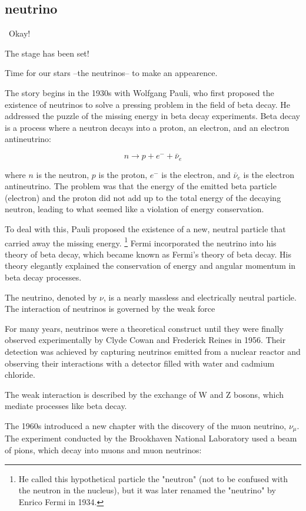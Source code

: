\subsection{neutrino}\
Okay!

The stage has been set!

Time for our stars --the neutrinos-- to make an appearence.

The story begins in the 1930s with Wolfgang Pauli, who first proposed the existence of neutrinos to solve a pressing problem in the field of beta decay.
He addressed the puzzle of the missing energy in beta decay experiments.
Beta decay is a process where a neutron decays into a proton, an electron, and an electron antineutrino:

\[
  n \rightarrow p + e^- + \bar{\nu}_e
\]

where \( n \) is the neutron, \( p \) is the proton, \( e^- \) is the electron, and \( \bar{\nu}_e \) is the electron antineutrino.
The problem was that the energy of the emitted beta particle (electron) and the proton did not add up to the total energy of the decaying neutron, leading to what seemed like a violation of energy conservation.

To deal with this, Pauli proposed the existence of a new, neutral particle that carried away the missing energy.
\footnote{He called this hypothetical particle the "neutron" (not to be confused with the neutron in the nucleus), but it was later renamed the "neutrino" by Enrico Fermi in 1934.}
Fermi incorporated the neutrino into his theory of beta decay, which became known as Fermi's theory of beta decay.
His theory elegantly explained the conservation of energy and angular momentum in beta decay processes.

The neutrino, denoted by \( \nu \), is a nearly massless and electrically neutral particle.
The interaction of neutrinos is governed by the weak force

For many years, neutrinos were a theoretical construct until they were finally observed experimentally by Clyde Cowan and Frederick Reines in 1956.
Their detection was achieved by capturing neutrinos emitted from a nuclear reactor and observing their interactions with a detector filled with water and cadmium chloride.

The weak interaction is described by the exchange of W and Z bosons, which mediate processes like beta decay.

The 1960s introduced a new chapter with the discovery of the muon neutrino, $\nu_\mu$.
The experiment conducted by the Brookhaven National Laboratory used a beam of pions, which decay into muons and muon neutrinos:

